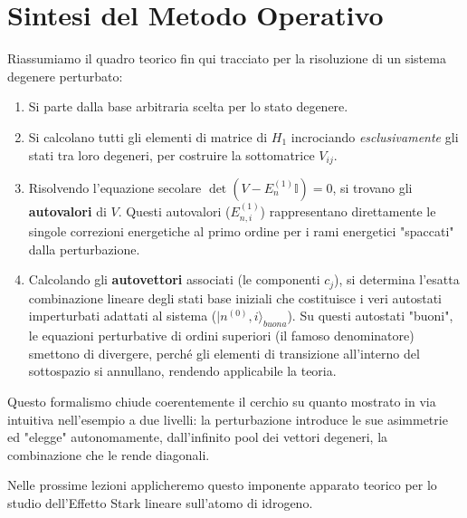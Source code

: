 \section{Sintesi del Metodo Operativo}

Riassumiamo il quadro teorico fin qui tracciato per la risoluzione di un sistema degenere perturbato:
\begin{enumerate}
\item Si parte dalla base arbitraria scelta per lo stato degenere.
\item Si calcolano tutti gli elementi di matrice di $H_1$ incrociando \textit{esclusivamente} gli stati tra loro degeneri, per costruire la sottomatrice $V_{ij}$.
\item Risolvendo l'equazione secolare $\det(V - E_n^{(1)} \mathbb{I}) = 0$, si trovano gli \textbf{autovalori} di $V$. Questi autovalori ($E_{n,i}^{(1)}$) rappresentano direttamente le singole correzioni energetiche al primo ordine per i rami energetici "spaccati" dalla perturbazione.
\item Calcolando gli \textbf{autovettori} associati (le componenti $c_j$), si determina l'esatta combinazione lineare degli stati base iniziali che costituisce i veri autostati imperturbati adattati al sistema ($\vert{}n^{(0)}, i\rangle_{buona}$). Su questi autostati "buoni", le equazioni perturbative di ordini superiori (il famoso denominatore) smettono di divergere, perché gli elementi di transizione all'interno del sottospazio si annullano, rendendo applicabile la teoria.
\end{enumerate}

Questo formalismo chiude coerentemente il cerchio su quanto mostrato in via intuitiva nell'esempio a due livelli: la perturbazione introduce le sue asimmetrie ed "elegge" autonomamente, dall'infinito pool dei vettori degeneri, la combinazione che le rende diagonali.

Nelle prossime lezioni applicheremo questo imponente apparato teorico per lo studio dell'Effetto Stark lineare sull'atomo di idrogeno.
